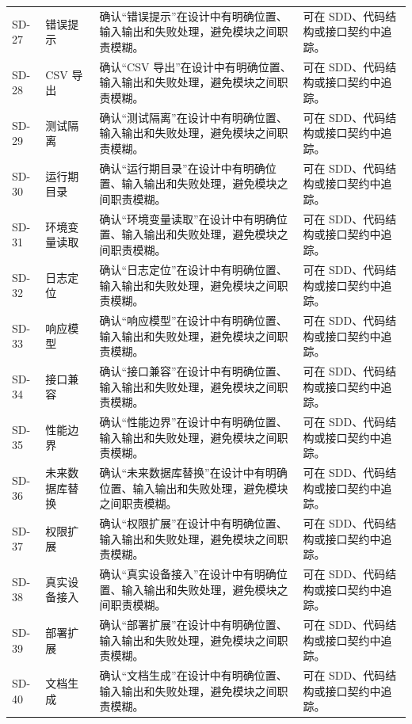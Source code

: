 \documentclass[12pt,a4paper]{ctexart}
\begin{document}
\begin{longtable}{L{1.7cm}L{3.2cm}L{6.4cm}L{4.0cm}}
SD-27 & 错误提示 & 确认“错误提示”在设计中有明确位置、输入输出和失败处理，避免模块之间职责模糊。 & 可在 SDD、代码结构或接口契约中追踪。 \\
SD-28 & CSV 导出 & 确认“CSV 导出”在设计中有明确位置、输入输出和失败处理，避免模块之间职责模糊。 & 可在 SDD、代码结构或接口契约中追踪。 \\
SD-29 & 测试隔离 & 确认“测试隔离”在设计中有明确位置、输入输出和失败处理，避免模块之间职责模糊。 & 可在 SDD、代码结构或接口契约中追踪。 \\
SD-30 & 运行期目录 & 确认“运行期目录”在设计中有明确位置、输入输出和失败处理，避免模块之间职责模糊。 & 可在 SDD、代码结构或接口契约中追踪。 \\
SD-31 & 环境变量读取 & 确认“环境变量读取”在设计中有明确位置、输入输出和失败处理，避免模块之间职责模糊。 & 可在 SDD、代码结构或接口契约中追踪。 \\
SD-32 & 日志定位 & 确认“日志定位”在设计中有明确位置、输入输出和失败处理，避免模块之间职责模糊。 & 可在 SDD、代码结构或接口契约中追踪。 \\
SD-33 & 响应模型 & 确认“响应模型”在设计中有明确位置、输入输出和失败处理，避免模块之间职责模糊。 & 可在 SDD、代码结构或接口契约中追踪。 \\
SD-34 & 接口兼容 & 确认“接口兼容”在设计中有明确位置、输入输出和失败处理，避免模块之间职责模糊。 & 可在 SDD、代码结构或接口契约中追踪。 \\
SD-35 & 性能边界 & 确认“性能边界”在设计中有明确位置、输入输出和失败处理，避免模块之间职责模糊。 & 可在 SDD、代码结构或接口契约中追踪。 \\
SD-36 & 未来数据库替换 & 确认“未来数据库替换”在设计中有明确位置、输入输出和失败处理，避免模块之间职责模糊。 & 可在 SDD、代码结构或接口契约中追踪。 \\
SD-37 & 权限扩展 & 确认“权限扩展”在设计中有明确位置、输入输出和失败处理，避免模块之间职责模糊。 & 可在 SDD、代码结构或接口契约中追踪。 \\
SD-38 & 真实设备接入 & 确认“真实设备接入”在设计中有明确位置、输入输出和失败处理，避免模块之间职责模糊。 & 可在 SDD、代码结构或接口契约中追踪。 \\
SD-39 & 部署扩展 & 确认“部署扩展”在设计中有明确位置、输入输出和失败处理，避免模块之间职责模糊。 & 可在 SDD、代码结构或接口契约中追踪。 \\
SD-40 & 文档生成 & 确认“文档生成”在设计中有明确位置、输入输出和失败处理，避免模块之间职责模糊。 & 可在 SDD、代码结构或接口契约中追踪。 \\
\bottomrule
\end{longtable}
\end{document}
